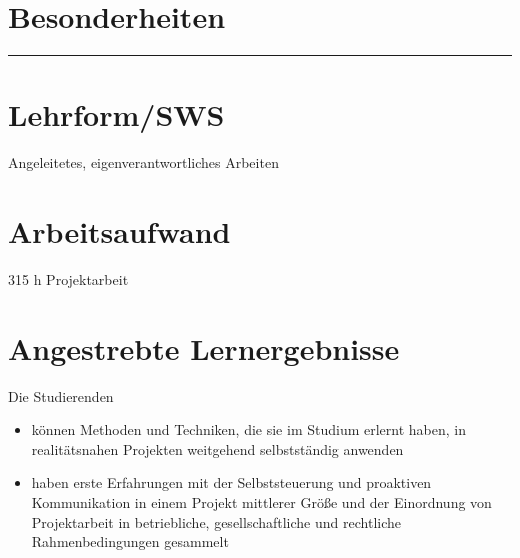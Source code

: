 \hypertarget{besonderheitenpathlabel....srcmodulbeschreibungen-bachelor-bpo5ba_praxisprojektarbeit}{%
\section*{Besonderheiten\label{../../src/modulbeschreibungen-bachelor-bpo5/BA_Praxisprojektarbeit}}\label{besonderheitenpathlabel....srcmodulbeschreibungen-bachelor-bpo5ba_praxisprojektarbeit}}

\begin{center}\rule{0.5\linewidth}{0.5pt}\end{center}

\hypertarget{lehrformswspathlabel....srcmodulbeschreibungen-bachelor-bpo5ba_praxisprojektarbeit}{%
\section*{Lehrform/SWS\label{../../src/modulbeschreibungen-bachelor-bpo5/BA_Praxisprojektarbeit}}\label{lehrformswspathlabel....srcmodulbeschreibungen-bachelor-bpo5ba_praxisprojektarbeit}}

Angeleitetes, eigenverantwortliches Arbeiten

\hypertarget{arbeitsaufwandpathlabel....srcmodulbeschreibungen-bachelor-bpo5ba_praxisprojektarbeit}{%
\section*{Arbeitsaufwand\label{../../src/modulbeschreibungen-bachelor-bpo5/BA_Praxisprojektarbeit}}\label{arbeitsaufwandpathlabel....srcmodulbeschreibungen-bachelor-bpo5ba_praxisprojektarbeit}}

315 h Projektarbeit

\hypertarget{angestrebte-lernergebnissepathlabel....srcmodulbeschreibungen-bachelor-bpo5ba_praxisprojektarbeit}{%
\section*{Angestrebte
Lernergebnisse\label{../../src/modulbeschreibungen-bachelor-bpo5/BA_Praxisprojektarbeit}}\label{angestrebte-lernergebnissepathlabel....srcmodulbeschreibungen-bachelor-bpo5ba_praxisprojektarbeit}}

Die Studierenden

\begin{itemize}
\tightlist
\item
  können Methoden und Techniken, die sie im Studium erlernt haben, in
  realitätsnahen Projekten weitgehend selbstständig anwenden
\item
  haben erste Erfahrungen mit der Selbststeuerung und proaktiven
  Kommunikation in einem Projekt mittlerer Größe und der Einordnung von
  Projektarbeit in betriebliche, gesellschaftliche und rechtliche
  Rahmenbedingungen gesammelt
\end{itemize}

